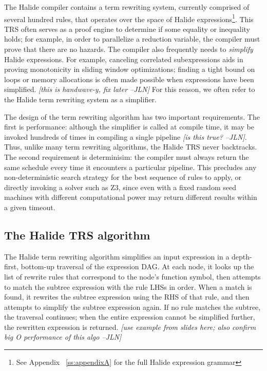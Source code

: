 \documentclass[sigplan,review,anonymous]{acmart}\settopmatter{printfolios=true,printccs=false,printacmref=false}
\newcommand{\jln}[1]{\textcolor{uwpurple}{\textit{[{#1} --JLN]}}}
\begin{document}
The Halide compiler contains a term rewriting system, currently comprised of several hundred rules, that operates over the space of Halide expressions\footnote{See Appendix ~\ref{ss:appendixA} for the full Halide expression grammar}. This TRS often serves as a proof engine to determine if some equality or inequality holds; for example, in order to parallelize a reduction variable, the compiler must prove that there are no hazards. The compiler also frequently needs to \emph{simplify} Halide expressions. For example, canceling correlated subexpressions aids in proving monotonicity in sliding window optimizations; finding a tight bound on loops or memory allocations is often made possible when expressions have been simplified. \jln{this is handwave-y, fix later} For this reason, we often refer to the Halide term rewriting system as a simplifier.

The design of the term rewriting algorithm has two important requirements. The first is performance: although the simplifier is called at compile time, it may be invoked hundreds of times in compiling a single pipeline \jln{is this true?}. Thus, unlike many term rewriting algorithms, the Halide TRS never backtracks. The second requirement is determinisim: the compiler must always return the same schedule every time it encounters a particular pipeline. This precludes any non-deterministic search strategy for the best sequence of rules to apply, or directly invoking a solver such as Z3, since even with a fixed random seed machines with different computational power may return different results within a given timeout.

\subsection{The Halide TRS algorithm}

The Halide term rewriting algorithm simplifies an input expression in a depth-first, bottom-up traversal of the expression DAG. At each node, it looks up the list of rewrite rules that correspond to the node's function symbol, then attempts to match the subtree expression with the rule LHSs in order. When a match is found, it rewrites the subtree expression using the RHS of that rule, and then attempts to simplify the subtree expression again. If no rule matches the subtree, the traversal continues; when the entire expression cannot be simplified further, the rewritten expression is returned. \jln{use example from slides here; also confirm big O performance of this algo}
\end{document}
